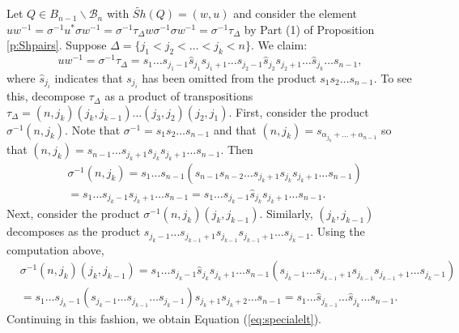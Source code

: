 \documentclass[12pt]{amsart}
\numberwithin{equation}{section}
\newcommand{\B}{\mathcal{B}}
\newcommand{\Borbitspace}{B_{n-1}\backslash\B_{n}}
\begin{document}


Let $Q\in\Borbitspace$ with $\widetilde{Sh}(Q)=(w,u)$ and consider the element $uw^{-1}=\sigma^{-1}u^{*}\sigma w^{-1}=\sigma^{-1}\tau_{\Delta}w\sigma^{-1}\sigma w^{-1}=\sigma^{-1}\tau_{\Delta}$ by Part (1) of Proposition \ref{p:Shpairs}.  
Suppose $\Delta=\{j_{1}<j_{2}<\dots < j_{k}<n\}$.  We claim:
\begin{equation}\label{eq:specialelt}
uw^{-1}=\sigma^{-1}\tau_{\Delta}=s_{1}\dots s_{j_{1}-1}\hat{s}_{j_{1}}s_{j_{1}+1}\dots s_{j_{2}-1}\hat{s}_{j_{2}}s_{j_{2}+1}\dots \hat{s}_{j_{k}}\dots s_{n-1},
\end{equation}
where $\hat{s}_{j_{i}}$ indicates that $s_{j_{i}}$ has been omitted from the product $s_{1}s_{2}\dots s_{n-1}$.  To see this, decompose $\tau_{\Delta}$ as a product of transpositions 
$\tau_{\Delta}=(n,j_{k})(j_{k}, j_{k-1})\dots (j_{3}, j_{2})(j_{2},j_{1})$.  First, consider the product $\sigma^{-1}(n,j_{k})$.  Note that $\sigma^{-1}=s_{1}s_{2}\dots s_{n-1}$ and that 
 $(n,j_{k})=s_{\alpha_{j_{k}}+\dots +\alpha_{n-1}}$ so that 
$(n,j_{k})=s_{n-1}\dots s_{j_{k}+1} s_{j_{k}} s_{j_{k}+1}\dots s_{n-1}$.  Then  
\begin{eqnarray*}
&\sigma^{-1}(n, j_{k})=s_{1}\dots s_{n-1}(s_{n-1}s_{n-2}\dots s_{j_{k}+1} s_{j_{k}} s_{j_{k}+1}\dots s_{n-1})\\
&=s_{1}\dots s_{j_{k}-1}s_{j_{k}+1}\dots s_{n-1}= s_{1}\dots s_{j_{k}-1} \hat{s}_{j_{k}} s_{j_{k}+1}\dots s_{n-1}.
\end{eqnarray*}
Next, consider the product $\sigma^{-1}(n,j_{k})(j_{k},j_{k-1})$.  Similarly, $(j_{k},j_{k-1})$ decomposes as the product $s_{j_{k}-1}\dots s_{j_{k-1}+1} s_{j_{k-1}}s_{j_{k-1}+1}\dots s_{j_{k}-1}$.  Using the computation above, 
\begin{eqnarray*}&\sigma^{-1}(n,j_{k})(j_{k},j_{k-1})=s_{1}\dots s_{j_{k}-1}\hat{s}_{j_{k}}s_{j_{k}+1}\dots s_{n-1}(s_{j_{k}-1}\dots s_{j_{k-1}+1} s_{j_{k-1}}s_{j_{k-1}+1}\dots s_{j_{k}-1})\\
&=
s_{1}\dots s_{j_{k}-1}(s_{j_{k}-1}\dots s_{j_{k-1}}\dots s_{j_{k}-1})s_{j_{k}+1}s_{j_{k}+2}\dots s_{n-1}=s_{1}\dots \hat{s}_{j_{k-1}}\dots \hat{s}_{j_{k}}\dots s_{n-1}. 
\end{eqnarray*}
Continuing in this fashion, we obtain Equation (\ref{eq:specialelt}).
\end{document}
